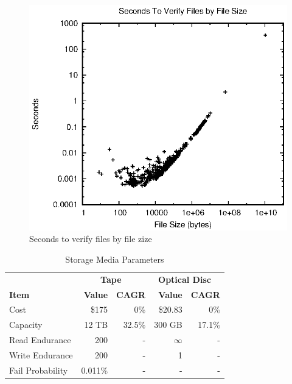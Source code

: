 \begin{figure}[!ht]
\includegraphics[width=\linewidth]{fig8.eps}
\caption{Seconds to verify files by file zize}
\label{fig8}
\end{figure}

\begin{table}[!hbt]
\begin{minipage}{\linewidth}
\centering
  \caption{Storage Media Parameters}
  \label{tab:media}
  \begin{tabular}{l|rr|rr}
    \toprule
    &\multicolumn{2}{|c|}{\textbf{Tape~\cite{web25}}}&\multicolumn{2}{|c}{\textbf{Optical Disc~\cite{web22}}}\\
    \textbf{Item}&\textbf{Value}&\textbf{CAGR}&\textbf{Value}&\textbf{CAGR}\\
    \midrule
    Cost&\$175&0\%&\$20.83&0\%\\
    Capacity&12 TB&32.5\%&300 GB&17.1\%\\
    Read Endurance&200&-&$\infty$&-\\
    Write Endurance&200&-&1&-\\
    Fail Probability&0.011\%&-&-&-\\
  \bottomrule
\end{tabular}
\end{minipage}
\end{table}